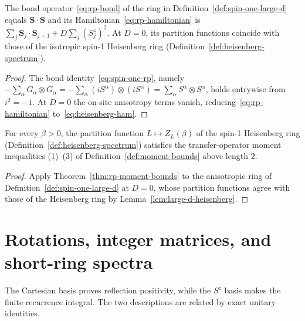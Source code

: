 \begin{lemma}
  \label{lem:large-d-heisenberg}
  \leanok
  The bond operator~\eqref{eq:rp-bond} of the ring in Definition~\ref{def:spin-one-large-d} equals
  \(\mathbf S \cdot \mathbf S\) and its Hamiltonian~\eqref{eq:rp-hamiltonian} is
  \(\sum_j \mathbf S_j \cdot \mathbf S_{j+1} + D \sum_j (S^z_j)^2\). At \(D = 0\), its partition
  functions coincide with those of the isotropic spin-1 Heisenberg ring
  (Definition~\ref{def:heisenberg-spectrum}).
\end{lemma}
\begin{proof}
  \leanok
  The bond identity~\eqref{eq:spin-one-rp}, namely
  \(-\sum_\alpha G_\alpha \otimes G_\alpha = -\sum_\alpha (iS^\alpha) \otimes (iS^\alpha) =
  \sum_\alpha S^\alpha \otimes S^\alpha\), holds entrywise from \(i^2 = -1\). At \(D = 0\) the
  on-site anisotropy terms vanish, reducing~\eqref{eq:rp-hamiltonian} to~\eqref{eq:heisenberg-ham}.
\end{proof}

\begin{theorem}
  \label{thm:heisenberg-moments}
  \leanok
  For every \(\beta > 0\), the partition function \(L \mapsto Z_L(\beta)\) of the spin-1 Heisenberg
  ring (Definition~\ref{def:heisenberg-spectrum}) satisfies the transfer-operator moment
  inequalities (1)--(3) of Definition~\ref{def:moment-bounds} above length \(2\).
\end{theorem}
\begin{proof}
  \leanok
  Apply Theorem~\ref{thm:rp-moment-bounds} to the anisotropic ring of
  Definition~\ref{def:spin-one-large-d} at \(D = 0\), whose partition functions agree with those of
  the Heisenberg ring by Lemma~\ref{lem:large-d-heisenberg}.
\end{proof}

\section{Rotations, integer matrices, and short-ring spectra}

The Cartesian basis proves reflection positivity, while the \(S^z\) basis makes the finite
recurrence integral. The two descriptions are related by exact unitary identities.

